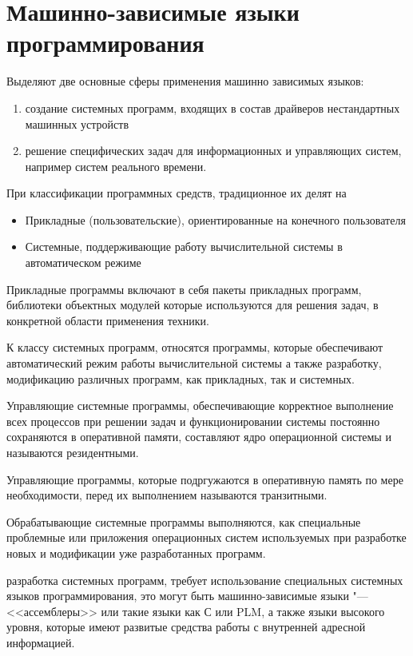 \section{Машинно-зависимые языки программирования}

Выделяют две основные сферы применения машинно зависимых языков:
\begin{enumerate}
    \item создание системных программ, входящих в состав драйверов нестандартных машинных устройств
    \item решение специфических задач для информационных и управляющих систем, например систем реального времени.
\end{enumerate}

При классификации программных средств, традиционное их делят на
\begin{itemize}
    \item Прикладные (пользовательские), ориентированные на конечного пользователя
    \item Системные, поддерживающие работу вычислительной системы в автоматическом режиме
\end{itemize}

Прикладные программы включают в себя пакеты прикладных программ, библиотеки объектных модулей
которые используются для решения задач, в конкретной области применения техники.

К классу системных программ, относятся программы, которые обеспечивают автоматический режим работы вычислительной системы
а также разработку, модификацию различных программ, как прикладных, так и системных.

Управляющие системные программы, обеспечивающие корректное выполнение всех процессов
при решении задач и функционировании системы постоянно сохраняются в оперативной памяти,
составляют ядро операционной системы и называются резидентными.

Управляющие программы, которые подргужаются в оперативную память по мере необходимости, перед их выполнением
называются транзитными. 

Обрабатывающие системные программы выполняются, как специальные проблемные или приложения операционных систем
используемых при разработке новых и модификации уже разработанных программ.

разработка системных программ, требует использование специальных системных языков программирования, это могут быть машинно-зависимые языки "--- <<ассемблеры>> или такие языки как С или PLM, а также языки
высокого уровня, которые имеют развитые средства работы с внутренней адресной информацией.

